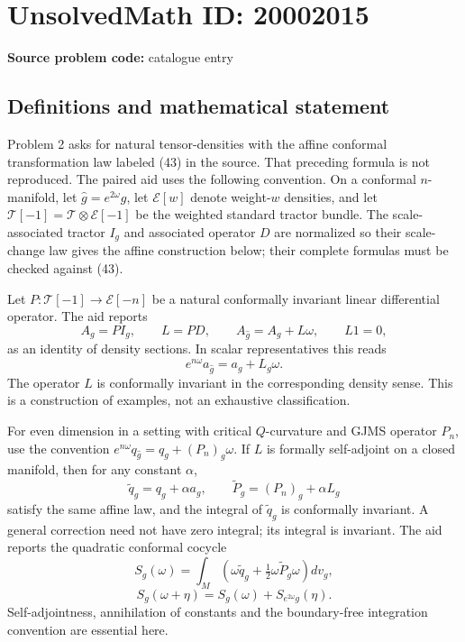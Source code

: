 \documentclass[11pt]{article}
\begin{document}
\section*{UnsolvedMath ID: 20002015}
\textbf{Source problem code:} catalogue entry
\subsection{Definitions and mathematical statement}
Problem 2 asks for natural tensor-densities with the affine conformal transformation law labeled (43) in the source. That preceding formula is not reproduced. The paired aid uses the following convention. On a conformal \(n\)-manifold, let \(\widehat g=e^{2\omega}g\), let \(\mathcal E[w]\) denote weight-\(w\) densities, and let \(\mathcal T[-1]=\mathcal T\otimes\mathcal E[-1]\) be the weighted standard tractor bundle. The scale-associated tractor \(I_g\) and associated operator \(D\) are normalized so their scale-change law gives the affine construction below; their complete formulas must be checked against (43).

Let \(P:\mathcal T[-1]\to\mathcal E[-n]\) be a natural conformally invariant linear differential operator. The aid reports
\[
 A_g=PI_g,\qquad L=PD,\qquad
 A_{\widehat g}=A_g+L\omega,\qquad L1=0,
\]
as an identity of density sections. In scalar representatives this reads
\[
 e^{n\omega}a_{\widehat g}=a_g+L_g\omega.
\]
The operator \(L\) is conformally invariant in the corresponding density sense. This is a construction of examples, not an exhaustive classification.

For even dimension in a setting with critical \(Q\)-curvature and GJMS operator \(P_n\), use the convention
\(e^{n\omega}q_{\widehat g}=q_g+(P_n)_g\omega\). If \(L\) is formally self-adjoint on a closed manifold, then for any constant \(\alpha\),
\[
 \widetilde q_g=q_g+\alpha a_g,\qquad
 \widetilde P_g=(P_n)_g+\alpha L_g
\]
satisfy the same affine law, and the integral of \(\widetilde q_g\) is conformally invariant. A general correction need not have zero integral; its integral is invariant. The aid reports the quadratic conformal cocycle
\[
 S_g(\omega)=\int_M\left(
 \omega\widetilde q_g+\tfrac12\omega\widetilde P_g\omega
 \right)dv_g,
\]
\[
 S_g(\omega+\eta)=S_g(\omega)+S_{e^{2\omega}g}(\eta).
\]
Self-adjointness, annihilation of constants and the boundary-free integration convention are essential here.
\end{document}
